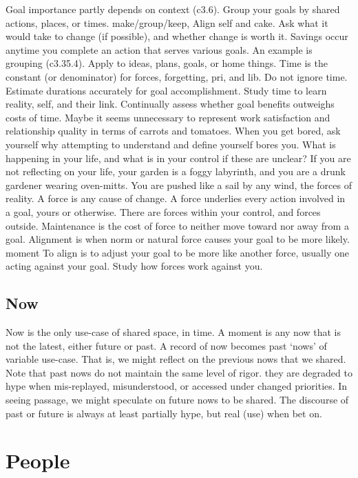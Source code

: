 \documentclass[
]{book}
\begin{document}
Goal importance partly depends on context (c3.6).
Group your goals by shared actions, places, or times. make/group/keep,
Align self and cake.
Ask what it would take to change (if possible), and whether change is worth it.
Savings occur anytime you complete an action that serves various goals.
An example is grouping (c3.35.4).
Apply to ideas, plans, goals, or home things.
Time is the constant (or denominator) for forces, forgetting, pri, and lib.
Do not ignore time.
Estimate durations accurately for goal accomplishment.
Study time to learn reality, self, and their link.
Continually assess whether goal benefits outweighs costs of time.
Maybe it seems unnecessary to represent work satisfaction and relationship quality in terms of carrots and tomatoes.
When you get bored, ask yourself why attempting to understand and define yourself bores you.
What is happening in your life, and what is in your control if these are unclear?
If you are not reflecting on your life, your garden is a foggy labyrinth, and you are a drunk gardener wearing oven-mitts.
You are pushed like a sail by any wind, the forces of reality.
A force is any cause of change.
A force underlies every action involved in a goal, yours or otherwise.
There are forces within your control, and forces outside.
Maintenance is the cost of force to neither move toward nor away from a goal.
Alignment is when norm or natural force causes your goal to be more likely. moment
To align is to adjust your goal to be more like another force, usually one acting against your goal.
Study how forces work against you.

\section{Now}\label{now}

Now is the only use-case of shared space, in time.
A moment is any now that is not the latest, either future or past.
A record of now becomes past `nows' of variable use-case.
That is, we might reflect on the previous nows that we shared.
Note that past nows do not maintain the same level of rigor. they are degraded to hype when mis-replayed, misunderstood, or accessed under changed priorities.
In seeing passage, we might speculate on future nows to be shared.
The discourse of past or future is always at least partially hype, but real (use) when bet on.

\chapter{People}\label{people}
\end{document}
